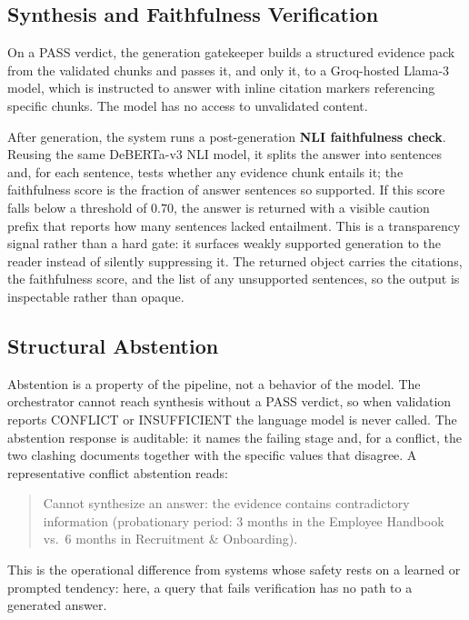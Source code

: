 \documentclass[conference]{IEEEtran}
\begin{document}
\subsection{Synthesis and Faithfulness Verification}
\label{sec:synthesis}
On a PASS verdict, the generation gatekeeper builds a structured evidence
pack from the validated chunks and passes it, and only it, to a
Groq-hosted Llama-3 model, which is instructed to answer with inline
citation markers referencing specific chunks. The model has no access to
unvalidated content.

After generation, the system runs a post-generation \textbf{NLI
faithfulness check}. Reusing the same DeBERTa-v3 NLI model, it splits the
answer into sentences and, for each sentence, tests whether any evidence
chunk entails it; the faithfulness score is the fraction of answer
sentences so supported. If this score falls below a threshold of $0.70$,
the answer is returned with a visible caution prefix that reports how many
sentences lacked entailment. This is a transparency signal rather than a
hard gate: it surfaces weakly supported generation to the reader instead of
silently suppressing it. The returned object carries the citations, the
faithfulness score, and the list of any unsupported sentences, so the
output is inspectable rather than opaque.

\subsection{Structural Abstention}
\label{sec:abstention}
Abstention is a property of the pipeline, not a behavior of the model. The
orchestrator cannot reach synthesis without a PASS verdict, so when
validation reports CONFLICT or INSUFFICIENT the language model is never
called. The abstention response is auditable: it names the failing stage
and, for a conflict, the two clashing documents together with the specific
values that disagree. A representative conflict abstention reads:
\begin{quote}\small\ttfamily
Cannot synthesize an answer: the evidence contains contradictory
information (probationary period: 3 months in the Employee Handbook vs.\
6 months in Recruitment \& Onboarding).
\end{quote}
This is the operational difference from systems whose safety rests on a
learned or prompted tendency: here, a query that fails verification has no
path to a generated answer.

\end{document}
